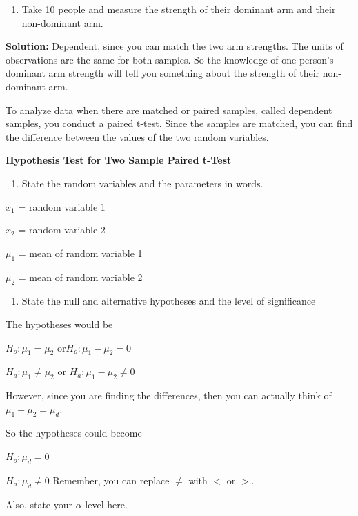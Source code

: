 \documentclass[
]{book}
\providecommand{\tightlist}{%
  \setlength{\itemsep}{0pt}\setlength{\parskip}{0pt}}
\begin{document}
\begin{enumerate}
\def\labelenumi{\alph{enumi}.}
\setcounter{enumi}{2}
\tightlist
\item
  Take 10 people and measure the strength of their dominant arm and their non-dominant arm.
\end{enumerate}

\textbf{Solution:}
Dependent, since you can match the two arm strengths. The units of observations are the same for both samples. So the knowledge of one person's dominant arm strength will tell you something about the strength of their non-dominant arm.

To analyze data when there are matched or paired samples, called dependent samples, you conduct a paired t-test. Since the samples are matched, you can find the difference between the values of the two random variables.

\textbf{Hypothesis Test for Two Sample Paired t-Test}

\begin{enumerate}
\def\labelenumi{\arabic{enumi}.}
\tightlist
\item
  State the random variables and the parameters in words.
\end{enumerate}

\(x_1\) = random variable 1

\(x_2\) = random variable 2

\(\mu_1\) = mean of random variable 1

\(\mu_2\) = mean of random variable 2

\begin{enumerate}
\def\labelenumi{\arabic{enumi}.}
\setcounter{enumi}{1}
\tightlist
\item
  State the null and alternative hypotheses and the level of significance
\end{enumerate}

The hypotheses would be

\(H_o:\mu_1=\mu_2\) or\(H_o:\mu_1-\mu_2=0\)

\(H_a:\mu_1\ne \mu_2\) or \(H_a:\mu_1-\mu_2\ne0\)

However, since you are finding the differences, then you can actually think of \(\mu_1-\mu_2=\mu_d\).

So the hypotheses could become

\(H_o:\mu_d=0\)

\(H_a:\mu_d\ne 0\) Remember, you can replace \(\ne\) with \(<\) or \(>\).

Also, state your \(\alpha\) level here.
\end{document}
